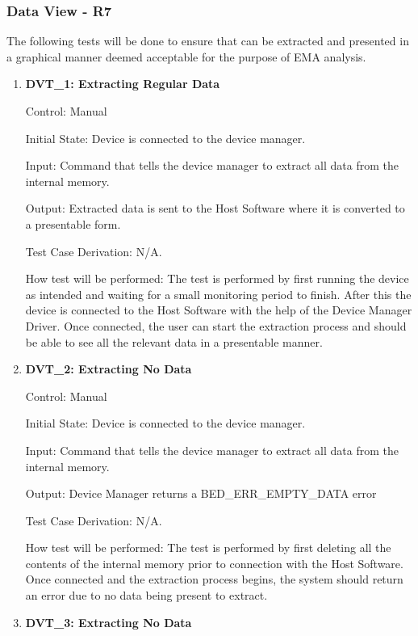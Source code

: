 \documentclass[12pt, titlepage]{article}
\begin{document}
\subsubsection{Data View - \textbf{R7}}

The following tests will be done to ensure that can be extracted and presented in a graphical manner deemed acceptable for the purpose of EMA analysis.
\begin{enumerate}
	\item{\textbf{DVT\_1: Extracting Regular Data} \\}
	
		Control: Manual 
							
		Initial State: Device is connected to the device manager.
							
		Input: Command that tells the device manager to extract all data from the internal memory.
		
		Output: Extracted data is sent to the Host Software where it is converted to a presentable form.
		
		Test Case Derivation: N/A.
							
		How test will be performed: The test is performed by first running the device as intended and waiting for a small monitoring period to finish. After this the device is connected to the Host Software with the 				help of the Device Manager Driver. Once connected, the user can start the extraction process and should be able to see all the relevant data in a presentable manner.

	\item{\textbf{DVT\_2: Extracting No Data} \\}
	
		Control: Manual 
							
		Initial State: Device is connected to the device manager.
							
		Input: Command that tells the device manager to extract all data from the internal memory.
		
		Output: Device Manager returns a BED\_ERR\_EMPTY\_DATA error
		
		Test Case Derivation: N/A.
							
		How test will be performed: The test is performed by first deleting all the contents of the internal memory prior to connection with the Host Software. Once connected and the extraction process begins, the 				system should return an error due to no data being present to extract.

	\item{\textbf{DVT\_3: Extracting No Data} \\}
	

\end{enumerate}
\end{document}
